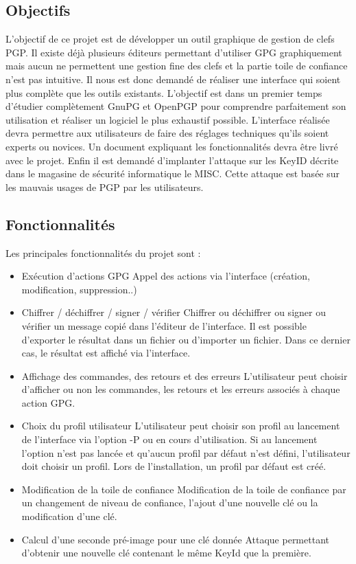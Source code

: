 \documentclass{../res/univ-projet}
\begin{document}
  \subsection{Objectifs}
  L'objectif de ce projet est de développer un outil graphique de gestion de clefs PGP. Il existe déjà plusieurs éditeurs permettant d'utiliser GPG graphiquement mais aucun ne permettent une gestion fine des clefs et la partie toile de confiance n'est pas intuitive. Il nous est donc demandé de réaliser une interface qui soient plus complète que les outils existants. L'objectif est dans un premier temps d'étudier complètement GnuPG et OpenPGP pour comprendre parfaitement son utilisation et réaliser un logiciel le plus exhaustif possible. L'interface réalisée devra permettre aux utilisateurs de faire des réglages techniques qu'ils soient experts ou novices. Un document expliquant les fonctionnalités devra être livré avec le projet.
  Enfin il est demandé d'implanter l'attaque sur les KeyID décrite dans le magasine de sécurité informatique le MISC. Cette attaque est basée sur les mauvais usages de PGP par les utilisateurs.
  
  \newpage
  
  \subsection{Fonctionnalités}
  
  Les principales fonctionnalités du projet sont : \medbreak
  \begin{itemize}
  \item Exécution d'actions GPG \smallbreak
  Appel des actions via l'interface (création, modification, suppression..) \smallbreak
  \item Chiffrer / déchiffrer / signer / vérifier \smallbreak
  Chiffrer ou déchiffrer ou signer ou vérifier un message copié dans l'éditeur de l'interface. Il est possible d'exporter le résultat dans un fichier ou d'importer un fichier. Dans ce dernier cas, le résultat est affiché via l'interface. \smallbreak
  \item Affichage des commandes, des retours et des erreurs \smallbreak
  L'utilisateur peut choisir d'afficher ou non les commandes, les retours et les erreurs associés à chaque action GPG. \smallbreak 
  \item Choix du profil utilisateur \smallbreak
  L'utilisateur peut choisir son profil au lancement de l'interface via l'option -P ou en cours d'utilisation. Si au lancement l'option n'est pas lancée et qu'aucun profil par défaut n'est défini, l'utilisateur doit choisir un profil. Lors de l'installation, un profil par défaut est créé. \smallbreak
  \item Modification de la toile de confiance \smallbreak
  Modification de la toile de confiance par un changement de niveau de confiance, l'ajout d'une nouvelle clé ou la modification d'une clé. \smallbreak
  \item Calcul d'une seconde pré-image pour une clé donnée \smallbreak
  Attaque permettant d'obtenir une nouvelle clé contenant le même KeyId que la première.
  \end{itemize}
  
\end{document}
